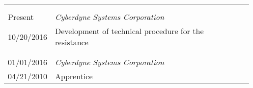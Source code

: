 \documentclass[11pt, letterpaper]{extarticle}
\begin{document}
	\begin{longtable}{C{0.154\linewidth}C{0.834\linewidth}N}
		                                                             &                                                                                                                                                                                                                                                  & \\[-0.25cm]
		                                                             &                                                                                                                                                                                                                                                  & \\[-0.25cm]
		Present                                                      & \textit{Cyberdyne Systems Corporation}                                                                                                                                                                                                           & \\*
		10/20/2016                                                   & Development of technical procedure for the resistance                                                                                                                                                                                            & \\*
		                                                             &                                                                                                                                                                                                                                                  & \\[-0.25cm]
		                                                             &                                                                                                                                                                                                                                                  & \\[-0.25cm]
		01/01/2016                                                   & \textit{Cyberdyne Systems Corporation}                                                                                                                                                                                                           & \\*
		04/21/2010                                                   & Apprentice                                                                                                                                                                                                                                       & \\*

\end{longtable}
\end{document}
